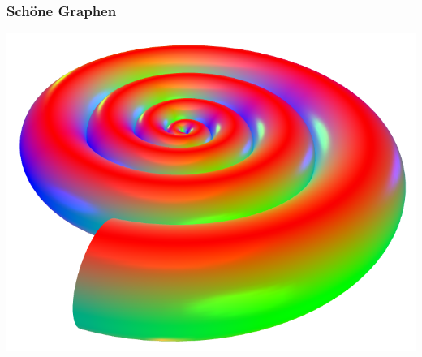 \documentclass{beamer}
\begin{document}
\begin{frame}\frametitle{Sch\"one Graphen}
\includegraphics[height=0.7\textheight]{images/graphs/schnecke.png}
\end{frame}
\end{document}
